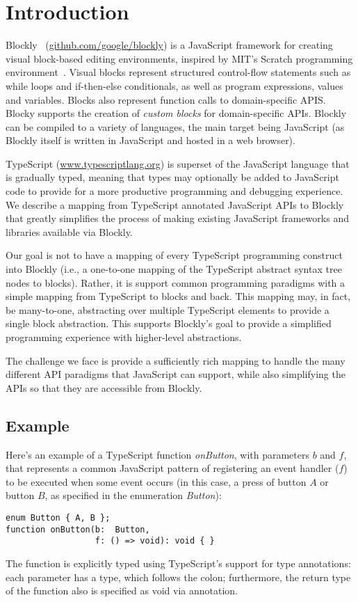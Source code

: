 \section{Introduction}

Blockly~\cite{Blocky2015} (\url{github.com/google/blockly}) 
is a JavaScript framework for creating visual block-based editing environments, 
inspired by MIT’s Scratch programming environment~\cite{ScratchCACM2009}.  Visual blocks represent structured 
control-flow statements such as while loops and if-then-else conditionals, as well as program expressions,
values and variables. 
Blocks also represent function calls to domain-specific APIS. Blocky supports the creation of \emph{custom 
blocks} for domain-specific APIs. Blockly can be compiled to a variety of languages, the main target 
being JavaScript (as Blockly itself is written in JavaScript and hosted in a web browser).

TypeScript (\url{www.typescriptlang.org}) is superset of the JavaScript language that is gradually typed, 
meaning that types may 
optionally be added to JavaScript code to provide for a more productive programming and debugging experience. 
We describe a mapping from TypeScript annotated JavaScript APIs to Blockly that greatly simplifies 
the process of making existing JavaScript frameworks and libraries available via Blockly.

Our goal is not to have a mapping of every TypeScript programming construct into Blockly 
(i.e., a one-to-one mapping of the TypeScript abstract syntax tree nodes to blocks).
Rather, it is support common programming paradigms with a simple mapping
from TypeScript to blocks and back.  This mapping may, in fact, be many-to-one, 
abstracting over multiple TypeScript elements to provide a single block abstraction.
This supports Blockly's goal to provide a simplified programming experience 
with higher-level abstractions. 

The challenge we face is provide a sufficiently rich mapping to handle the
many different API paradigms that JavaScript can support, while
also simplifying the APIs so that they are accessible from Blockly. 

\subsection{Example}

Here's an example of a TypeScript function \emph{onButton},
with parameters $b$ and $f$,
that represents a common JavaScript pattern of registering an event
handler ($f$) to be executed when some event occurs (in this case, 
a press of button $A$ or button $B$, as specified in the enumeration
\emph{Button}):
\begin{lstlisting}
enum Button { A, B };
function onButton(b:  Button, 
                  f: () => void): void { }
\end{lstlisting}
The function is explicitly typed using TypeScript's support for
type annotations: each parameter has a type, which follows the colon;
furthermore, the return type of the function also is specified as void
via annotation. 

